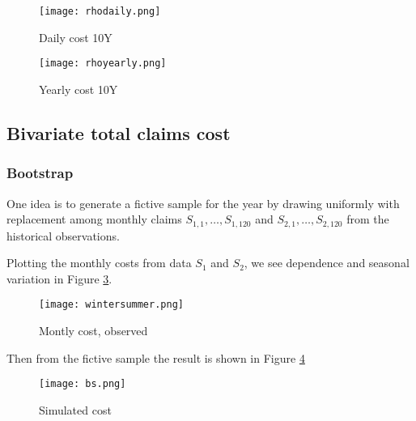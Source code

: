 \documentclass[11pt]{article}
\begin{document}
 \begin{figure}[H]
 \center
  \texttt{[image: rhodaily.png]}
  \caption{Daily cost 10Y}
  \label{fig:samplefig4}
\end{figure}

 \begin{figure}[H]
 \center
  \texttt{[image: rhoyearly.png]}
  \caption{Yearly cost 10Y}
  \label{fig:samplefig10y}
\end{figure}



\subsection*{Bivariate total claims cost}

\subsubsection*{Bootstrap}
One idea is to generate a fictive
sample for the year by drawing uniformly with replacement among monthly claims $S_{1,1},\dots,S_{1,120}$
and $S_{2,1},\dots,S_{2,120}$
from the historical observations. 

Plotting the monthly costs from data $S_1$ and $S_2$, we see dependence and seasonal variation in Figure \ref{fig:season}.
 \begin{figure}[H]
 \center
  \texttt{[image: wintersummer.png]}
  \caption{Montly cost, observed}
  \label{fig:season}
\end{figure}


Then from the fictive sample the result is shown in Figure \ref{fig:bs}
 \begin{figure}[h]
 \center
  \texttt{[image: bs.png]}
  \caption{Simulated cost}
  \label{fig:bs}
\end{figure}

\end{document}
